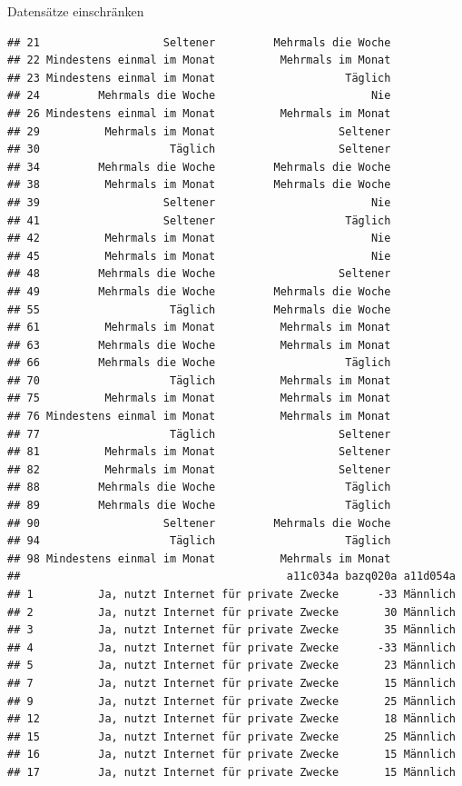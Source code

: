 \documentclass[ignorenonframetext,]{beamer}
\begin{document}
\begin{frame}[fragile]{Datensätze einschränken}
\begin{verbatim}
## 21                   Seltener         Mehrmals die Woche
## 22 Mindestens einmal im Monat          Mehrmals im Monat
## 23 Mindestens einmal im Monat                    Täglich
## 24         Mehrmals die Woche                        Nie
## 26 Mindestens einmal im Monat          Mehrmals im Monat
## 29          Mehrmals im Monat                   Seltener
## 30                    Täglich                   Seltener
## 34         Mehrmals die Woche         Mehrmals die Woche
## 38          Mehrmals im Monat         Mehrmals die Woche
## 39                   Seltener                        Nie
## 41                   Seltener                    Täglich
## 42          Mehrmals im Monat                        Nie
## 45          Mehrmals im Monat                        Nie
## 48         Mehrmals die Woche                   Seltener
## 49         Mehrmals die Woche         Mehrmals die Woche
## 55                    Täglich         Mehrmals die Woche
## 61          Mehrmals im Monat          Mehrmals im Monat
## 63         Mehrmals die Woche          Mehrmals im Monat
## 66         Mehrmals die Woche                    Täglich
## 70                    Täglich          Mehrmals im Monat
## 75          Mehrmals im Monat          Mehrmals im Monat
## 76 Mindestens einmal im Monat          Mehrmals im Monat
## 77                    Täglich                   Seltener
## 81          Mehrmals im Monat                   Seltener
## 82          Mehrmals im Monat                   Seltener
## 88         Mehrmals die Woche                    Täglich
## 89         Mehrmals die Woche                    Täglich
## 90                   Seltener         Mehrmals die Woche
## 94                    Täglich                    Täglich
## 98 Mindestens einmal im Monat          Mehrmals im Monat
##                                         a11c034a bazq020a a11d054a
## 1          Ja, nutzt Internet für private Zwecke      -33 Männlich
## 2          Ja, nutzt Internet für private Zwecke       30 Männlich
## 3          Ja, nutzt Internet für private Zwecke       35 Männlich
## 4          Ja, nutzt Internet für private Zwecke      -33 Männlich
## 5          Ja, nutzt Internet für private Zwecke       23 Männlich
## 7          Ja, nutzt Internet für private Zwecke       15 Männlich
## 9          Ja, nutzt Internet für private Zwecke       25 Männlich
## 12         Ja, nutzt Internet für private Zwecke       18 Männlich
## 15         Ja, nutzt Internet für private Zwecke       25 Männlich
## 16         Ja, nutzt Internet für private Zwecke       15 Männlich
## 17         Ja, nutzt Internet für private Zwecke       15 Männlich

\end{verbatim}
\end{frame}
\end{document}
